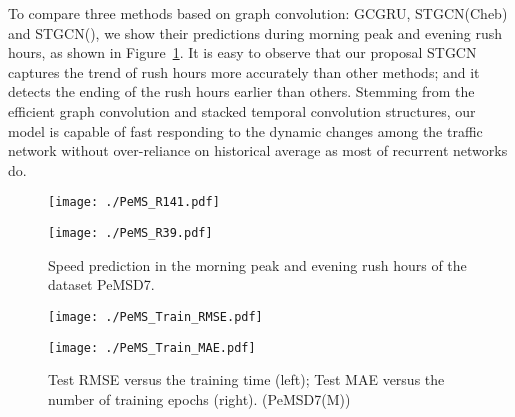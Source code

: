 \documentclass{article}
\begin{document}
To compare three methods based on graph convolution: GCGRU, STGCN(Cheb) and STGCN(), we show their predictions during morning peak and evening rush hours, as shown in Figure~\ref{fig:sp}. It is easy to observe that our proposal STGCN captures the trend of rush hours more accurately than other methods; and it detects the ending of the rush hours earlier than others. Stemming from the efficient graph convolution and stacked temporal convolution structures, our model is capable of fast responding to the dynamic changes among the traffic network without over-reliance on historical average as most of recurrent networks do.

\begin{figure}
\begin{minipage}[t]{0.5\linewidth}
\centering
\texttt{[image: ./PeMS\_R141.pdf]}
\end{minipage}\begin{minipage}[t]{0.5\linewidth}
\centering
\texttt{[image: ./PeMS\_R39.pdf]}
\end{minipage}
\caption{\label{fig:sp}Speed prediction in the morning peak and evening rush hours of the dataset PeMSD7.}
\end{figure}

\begin{figure}
\begin{minipage}[t]{0.5\linewidth}
\centering
\texttt{[image: ./PeMS\_Train\_RMSE.pdf]}
\end{minipage}\begin{minipage}[t]{0.5\linewidth}
\centering
\texttt{[image: ./PeMS\_Train\_MAE.pdf]}
\end{minipage}
\caption{\label{fig:rm}Test RMSE versus the training time (left); Test MAE versus the number of training epochs (right). (PeMSD7(M))}
\end{figure}
\end{document}
